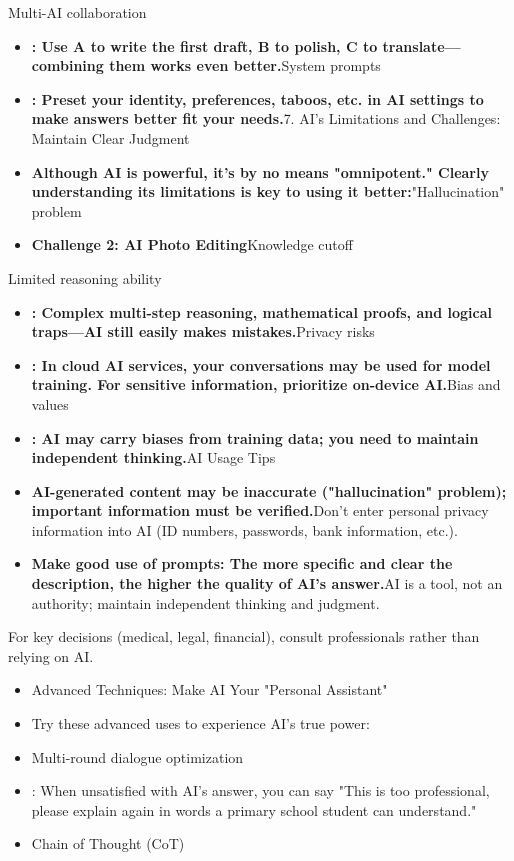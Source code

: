 Multi-AI collaboration

\begin{itemize}
  \item \textbf{: Use A to write the first draft, B to polish, C to translate—combining them works even better.}System prompts
  \item \textbf{: Preset your identity, preferences, taboos, etc. in AI settings to make answers better fit your needs.}7. AI's Limitations and Challenges: Maintain Clear Judgment
  \item \textbf{Although AI is powerful, it's by no means "omnipotent." Clearly understanding its limitations is key to using it better:}"Hallucination" problem
  \item \textbf{Challenge 2: AI Photo Editing}Knowledge cutoff
\end{itemize}


Limited reasoning ability

\begin{itemize}
  \item \textbf{: Complex multi-step reasoning, mathematical proofs, and logical traps—AI still easily makes mistakes.}Privacy risks
  \item \textbf{: In cloud AI services, your conversations may be used for model training. For sensitive information, prioritize on-device AI.}Bias and values
  \item \textbf{: AI may carry biases from training data; you need to maintain independent thinking.}AI Usage Tips
  \item \textbf{AI-generated content may be inaccurate ("hallucination" problem); important information must be verified.}Don't enter personal privacy information into AI (ID numbers, passwords, bank information, etc.).
  \item \textbf{Make good use of prompts: The more specific and clear the description, the higher the quality of AI's answer.}AI is a tool, not an authority; maintain independent thinking and judgment.
\end{itemize}

\begin{tcbinfo}{For key decisions (medical, legal, financial), consult professionals rather than relying on AI.}
\begin{itemize}
  \item Advanced Techniques: Make AI Your "Personal Assistant"
  \item Try these advanced uses to experience AI's true power:
  \item Multi-round dialogue optimization
  \item : When unsatisfied with AI's answer, you can say "This is too professional, please explain again in words a primary school student can understand."
  \item Chain of Thought (CoT)
\end{itemize}

\end{tcbinfo}

